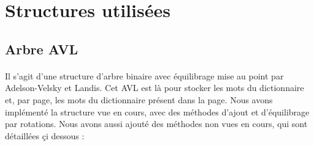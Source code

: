 \documentclass[a4paper]{article}
\begin{document}
	\newpage
		
	\section{Structures utilisées}
	
		\subsection{Arbre AVL}
		
		\paragraph{}{
		Il s'agit d'une structure d'arbre binaire avec équilibrage mise au point par 
		Adelson-Velsky et Landis. Cet AVL est là pour stocker les mots du dictionnaire et, 
		par page, les mots du dictionnaire présent dans la page. Nous avons implémenté la 
		structure vue en cours, avec des méthodes d'ajout et d'équilibrage par rotations. 
		Nous avons aussi ajouté des méthodes non vues en cours, qui sont détaillées çi dessous :
		}
		
\end{document}
